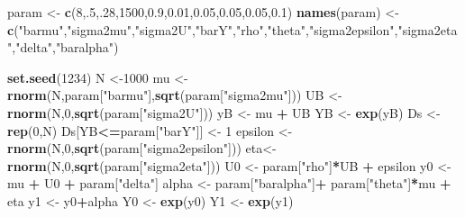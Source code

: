 \documentclass[]{book}
\newenvironment{Shaded}{\begin{snugshade}}{\end{snugshade}}
\newcommand{\KeywordTok}[1]{\textcolor[rgb]{0.13,0.29,0.53}{\textbf{#1}}}
\newcommand{\DecValTok}[1]{\textcolor[rgb]{0.00,0.00,0.81}{#1}}
\newcommand{\FloatTok}[1]{\textcolor[rgb]{0.00,0.00,0.81}{#1}}
\newcommand{\StringTok}[1]{\textcolor[rgb]{0.31,0.60,0.02}{#1}}
\newcommand{\OperatorTok}[1]{\textcolor[rgb]{0.81,0.36,0.00}{\textbf{#1}}}
\newcommand{\NormalTok}[1]{#1}
\theoremstyle{definition}
\theoremstyle{definition}
\theoremstyle{definition}
\theoremstyle{remark}
\begin{document}
\begin{Shaded}
\begin{Highlighting}[]
\NormalTok{param <-}\StringTok{ }\KeywordTok{c}\NormalTok{(}\DecValTok{8}\NormalTok{,.}\DecValTok{5}\NormalTok{,.}\DecValTok{28}\NormalTok{,}\DecValTok{1500}\NormalTok{,}\FloatTok{0.9}\NormalTok{,}\FloatTok{0.01}\NormalTok{,}\FloatTok{0.05}\NormalTok{,}\FloatTok{0.05}\NormalTok{,}\FloatTok{0.05}\NormalTok{,}\FloatTok{0.1}\NormalTok{)}
\KeywordTok{names}\NormalTok{(param) <-}\StringTok{ }\KeywordTok{c}\NormalTok{(}\StringTok{"barmu"}\NormalTok{,}\StringTok{"sigma2mu"}\NormalTok{,}\StringTok{"sigma2U"}\NormalTok{,}\StringTok{"barY"}\NormalTok{,}\StringTok{"rho"}\NormalTok{,}\StringTok{"theta"}\NormalTok{,}\StringTok{"sigma2epsilon"}\NormalTok{,}\StringTok{"sigma2eta"}\NormalTok{,}\StringTok{"delta"}\NormalTok{,}\StringTok{"baralpha"}\NormalTok{)}
\end{Highlighting}
\end{Shaded}

\begin{Shaded}
\begin{Highlighting}[]
\KeywordTok{set.seed}\NormalTok{(}\DecValTok{1234}\NormalTok{)}
\NormalTok{N <-}\DecValTok{1000}
\NormalTok{mu <-}\StringTok{ }\KeywordTok{rnorm}\NormalTok{(N,param[}\StringTok{"barmu"}\NormalTok{],}\KeywordTok{sqrt}\NormalTok{(param[}\StringTok{"sigma2mu"}\NormalTok{]))}
\NormalTok{UB <-}\StringTok{ }\KeywordTok{rnorm}\NormalTok{(N,}\DecValTok{0}\NormalTok{,}\KeywordTok{sqrt}\NormalTok{(param[}\StringTok{"sigma2U"}\NormalTok{]))}
\NormalTok{yB <-}\StringTok{ }\NormalTok{mu }\OperatorTok{+}\StringTok{ }\NormalTok{UB }
\NormalTok{YB <-}\StringTok{ }\KeywordTok{exp}\NormalTok{(yB)}
\NormalTok{Ds <-}\StringTok{ }\KeywordTok{rep}\NormalTok{(}\DecValTok{0}\NormalTok{,N)}
\NormalTok{Ds[YB}\OperatorTok{<=}\NormalTok{param[}\StringTok{"barY"}\NormalTok{]] <-}\StringTok{ }\DecValTok{1} 
\NormalTok{epsilon <-}\StringTok{ }\KeywordTok{rnorm}\NormalTok{(N,}\DecValTok{0}\NormalTok{,}\KeywordTok{sqrt}\NormalTok{(param[}\StringTok{"sigma2epsilon"}\NormalTok{]))}
\NormalTok{eta<-}\StringTok{ }\KeywordTok{rnorm}\NormalTok{(N,}\DecValTok{0}\NormalTok{,}\KeywordTok{sqrt}\NormalTok{(param[}\StringTok{"sigma2eta"}\NormalTok{]))}
\NormalTok{U0 <-}\StringTok{ }\NormalTok{param[}\StringTok{"rho"}\NormalTok{]}\OperatorTok{*}\NormalTok{UB }\OperatorTok{+}\StringTok{ }\NormalTok{epsilon}
\NormalTok{y0 <-}\StringTok{ }\NormalTok{mu }\OperatorTok{+}\StringTok{  }\NormalTok{U0 }\OperatorTok{+}\StringTok{ }\NormalTok{param[}\StringTok{"delta"}\NormalTok{]}
\NormalTok{alpha <-}\StringTok{ }\NormalTok{param[}\StringTok{"baralpha"}\NormalTok{]}\OperatorTok{+}\StringTok{  }\NormalTok{param[}\StringTok{"theta"}\NormalTok{]}\OperatorTok{*}\NormalTok{mu }\OperatorTok{+}\StringTok{ }\NormalTok{eta}
\NormalTok{y1 <-}\StringTok{ }\NormalTok{y0}\OperatorTok{+}\NormalTok{alpha}
\NormalTok{Y0 <-}\StringTok{ }\KeywordTok{exp}\NormalTok{(y0)}
\NormalTok{Y1 <-}\StringTok{ }\KeywordTok{exp}\NormalTok{(y1)}
\end{Highlighting}
\end{Shaded}
\end{document}
